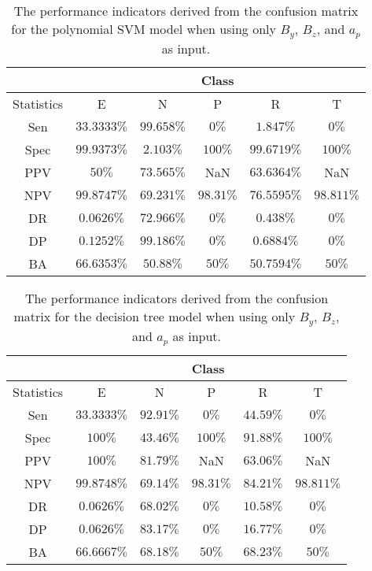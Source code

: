 \begin{table}[!ht]
	\centering
	\begin{tabular}{|c|c|c|c|c|c|}
		\hline
		 & \multicolumn{5}{c|}{Class} \\ \hline
		Statistics & E & N & P & R & T \\ \hline
		Sen & $33.3333\%$ & $99.658\%$ & $0\%$ & $1.847\%$ & $0\%$ \\ \hline
		Spec & $99.9373\%$ & $2.103\%$ & $100\%$ & $99.6719\%$ & $100\%$ \\ \hline
		PPV & $50\%$ & $73.565\%$ & NaN & $63.6364\%$ & NaN \\ \hline
		NPV & $99.8747\%$ & $69.231\%$ & $98.31\%$ & $76.5595\%$ & $98.811\%$ \\ \hline
		DR & $0.0626\%$ & $72.966\%$ & $0\%$ & $0.438\%$ & $0\%$ \\ \hline
		DP & $0.1252\%$ & $99.186\%$ & $0\%$ & $0.6884\%$ & $0\%$ \\ \hline
		BA & $66.6353\%$ & $50.88\%$ & $50\%$ & $50.7594\%$ & $50\%$ \\ \hline
	\end{tabular}
	\caption{The performance indicators derived from the confusion matrix for the polynomial SVM model when using only $B_{y}$, $B_{z}$, and $a_{p}$ as input.}
	\label{tab:cs:reverse:yzap:svmPoly}
\end{table}

\begin{table}[!ht]
	\centering
	\begin{tabular}{|c|c|c|c|c|c|}
		\hline
		 & \multicolumn{5}{c|}{Class} \\ \hline
		Statistics & E & N & P & R & T \\ \hline
		Sen & $33.3333\%$ & $92.91\%$ & $0\%$ & $44.59\%$ & $0\%$ \\ \hline
		Spec & $100\%$ & $43.46\%$ & $100\%$ & $91.88\%$ & $100\%$ \\ \hline
		PPV & $100\%$ & $81.79\%$ & NaN & $63.06\%$ & NaN \\ \hline
		NPV & $99.8748\%$ & $69.14\%$ & $98.31\%$ & $84.21\%$ & $98.811\%$ \\ \hline
		DR & $0.0626\%$ & $68.02\%$ & $0\%$ & $10.58\%$ & $0\%$ \\ \hline
		DP & $0.0626\%$ & $83.17\%$ & $0\%$ & $16.77\%$ & $0\%$ \\ \hline
		BA & $66.6667\%$ & $68.18\%$ & $50\%$ & $68.23\%$ & $50\%$ \\ \hline
	\end{tabular}
	\caption{The performance indicators derived from the confusion matrix for the decision tree model when using only $B_{y}$, $B_{z}$, and $a_{p}$ as input.}
	\label{tab:cs:reverse:yzap:C5.0}
\end{table}

